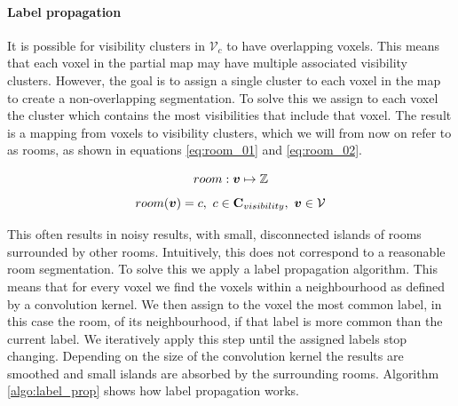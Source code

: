 \paragraph{Label propagation}
It is possible for visibility clusters in \(\mathcal{V}_{c}\) to have overlapping voxels. This means that each voxel in the partial map may have multiple associated visibility clusters. However, the goal is to assign a single cluster to each voxel in the map to create a non-overlapping segmentation. To solve this we assign to each voxel the cluster which contains the most visibilities that include that voxel. The result is a mapping from voxels to visibility clusters, which we will from now on refer to as rooms, as shown in equations \ref{eq:room_01} and \ref{eq:room_02}.

\begin{equation}
    \label{eq:room_01}
room: \boldsymbol{v} \mapsto \mathbb{Z}
\end{equation}
\begin{equation}
    \label{eq:room_02}
room(\boldsymbol{v}) = c,\ c \in \mathbf{C}_{visibility},\ \boldsymbol{v} \in \mathcal{V}
\end{equation}

This often results in noisy results, with small, disconnected islands of rooms surrounded by other rooms. Intuitively, this does not correspond to a reasonable room segmentation. To solve this we apply a label propagation algorithm. This means that for every voxel we find the voxels within a neighbourhood as defined by a convolution kernel. We then assign to the voxel the most common label, in this case the room, of its neighbourhood, if that label is more common than the current label. We iteratively apply this step until the assigned labels stop changing. Depending on the size of the convolution kernel the results are smoothed and small islands are absorbed by the surrounding rooms. Algorithm \ref{algo:label_prop} shows how label propagation works.

\pagebreak

